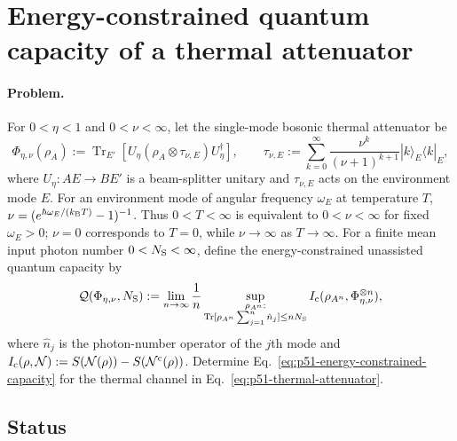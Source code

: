 \section{Energy-constrained quantum capacity of a thermal attenuator}
\label{sec:op_b65cf15705065d81}

\paragraph{Problem.}
For $0<\eta<1$ and $0<\nu<\infty$, let the single-mode bosonic thermal
attenuator be
\begin{equation}
  \Phi_{\eta,\nu}(\rho_A)
  :=\operatorname{Tr}_{E'}\!\left[
     U_\eta(\rho_A\otimes\tau_{\nu,E})U_\eta^\dagger
  \right],
  \qquad
  \tau_{\nu,E}:=\sum_{k=0}^{\infty}
     \frac{\nu^k}{(\nu+1)^{k+1}}
     |k\rangle_E\!\langle k|_E,
  \label{eq:p51-thermal-attenuator}
\end{equation}
where $U_\eta:AE\to BE'$ is a beam-splitter unitary and
$\tau_{\nu,E}$ acts on the environment mode $E$.  For an environment mode
of angular frequency $\omega_E$ at temperature $T$,
$\nu=(e^{\hbar\omega_E/(k_{\rm B}T)}-1)^{-1}$.  Thus $0<T<\infty$ is
equivalent to $0<\nu<\infty$ for fixed $\omega_E>0$; $\nu=0$ corresponds
to $T=0$, while $\nu\to\infty$ as $T\to\infty$.  For a finite mean input photon
number $0<N_{\rm S}<\infty$, define the energy-constrained unassisted quantum
capacity by
\begin{equation}
  \mathcal Q(\Phi_{\eta,\nu},N_{\rm S})
  :=\lim_{n\to\infty}\frac1n
  \sup_{\substack{\rho_{A^n}:\\
       \operatorname{Tr}[\rho_{A^n}\sum_{j=1}^n\hat n_j]
       \leq nN_{\rm S}}}
       I_{\rm c}(\rho_{A^n},\Phi_{\eta,\nu}^{\otimes n}),
  \label{eq:p51-energy-constrained-capacity}
\end{equation}
where $\hat n_j$ is the photon-number operator of the $j$th mode and
$I_{\rm c}(\rho,\mathcal N)
:=S(\mathcal N(\rho))-S(\mathcal N^{\rm c}(\rho))$.  Determine
Eq.~\eqref{eq:p51-energy-constrained-capacity} for the thermal channel in
Eq.~\eqref{eq:p51-thermal-attenuator}.

\subsection*{Status}

